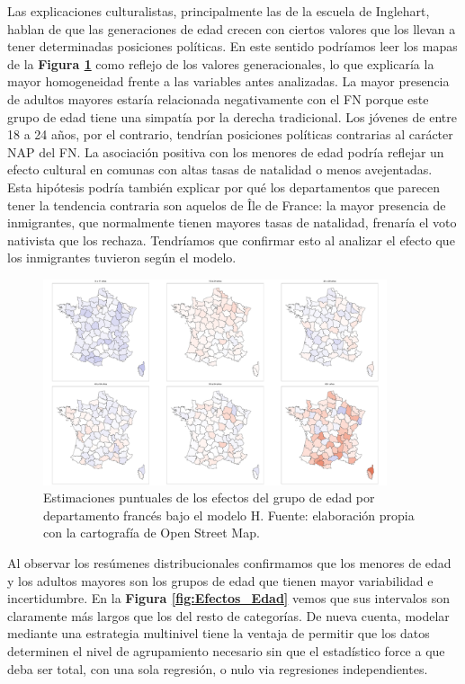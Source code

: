 Las explicaciones culturalistas, principalmente las de la escuela de Inglehart, hablan de que las generaciones de edad crecen con ciertos valores que los llevan a tener determinadas posiciones políticas. En este sentido podríamos leer los mapas de la \textbf{Figura \ref{fig:Mapa_Efectos_Edad}} como reflejo de los valores generacionales, lo que explicaría la mayor homogeneidad frente a las variables antes analizadas. La mayor presencia de adultos mayores estaría relacionada negativamente con el FN porque este grupo de edad tiene una simpatía por la derecha tradicional. Los jóvenes de entre 18 a 24 años, por el contrario, tendrían posiciones políticas contrarias al carácter NAP del FN. La asociación positiva con los menores de edad podría reflejar un efecto cultural en comunas con altas tasas de natalidad o menos avejentadas. Esta hipótesis podría también explicar por qué los departamentos que parecen tener la tendencia contraria son aquelos de Île de France: la mayor presencia de inmigrantes, que normalmente tienen mayores tasas de natalidad, frenaría el voto nativista que los rechaza. Tendríamos que confirmar esto al analizar el efecto que los inmigrantes tuvieron según el modelo.\\

\begin{figure}[h]
	\centering
	\includegraphics[width = 0.9\textwidth]{Figs/Efectos/Mapa_Efectos_Edad_Modelo_H}
	\caption{Estimaciones puntuales de los efectos del grupo de edad por departamento francés bajo el modelo H. Fuente: elaboración propia con la cartografía de Open Street Map.}
	\label{fig:Mapa_Efectos_Edad}
\end{figure}

Al observar los resúmenes distribucionales confirmamos que los menores de edad y los adultos mayores son los grupos de edad que tienen mayor variabilidad e incertidumbre. En la \textbf{Figura \ref{fig:Efectos_Edad}} vemos que sus intervalos son claramente más largos que los del resto de categorías. De nueva cuenta, modelar mediante una estrategia multinivel tiene la ventaja de permitir que los datos determinen el nivel de agrupamiento necesario sin que el estadístico force a que deba ser total, con una sola regresión, o nulo via regresiones independientes.\\ 

